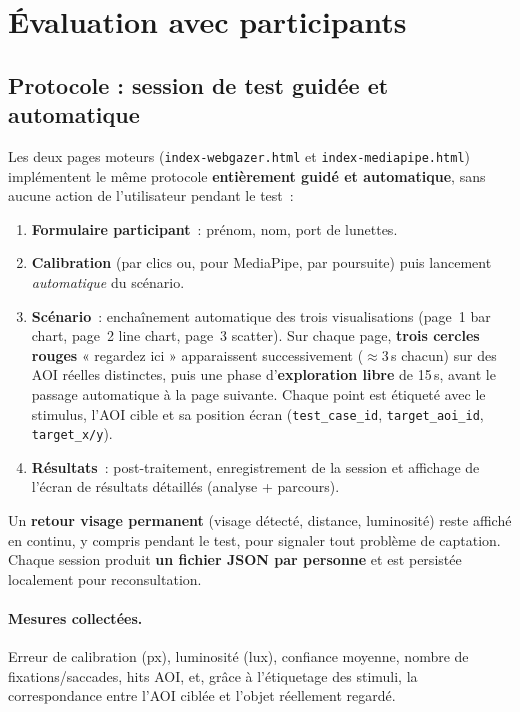 \documentclass[11pt,a4paper]{article}
\newcommand{\code}[1]{\texttt{\small #1}}
\begin{document}
\section{Évaluation avec participants}

\subsection{Protocole : session de test guidée et automatique}

Les deux pages moteurs (\code{index-webgazer.html} et \code{index-mediapipe.html})
implémentent le même protocole \textbf{entièrement guidé et automatique}, sans aucune
action de l'utilisateur pendant le test~:
\begin{enumerate}[leftmargin=1.5em]
  \item \textbf{Formulaire participant}~: prénom, nom, port de lunettes.
  \item \textbf{Calibration} (par clics ou, pour MediaPipe, par poursuite) puis
  lancement \emph{automatique} du scénario.
  \item \textbf{Scénario}~: enchaînement automatique des trois visualisations
  (page~1 bar chart, page~2 line chart, page~3 scatter). Sur chaque page,
  \textbf{trois cercles rouges} « regardez ici » apparaissent successivement
  ($\approx$3\,s chacun) sur des AOI réelles distinctes, puis une phase
  d'\textbf{exploration libre} de 15\,s, avant le passage automatique à la page
  suivante. Chaque point est étiqueté avec le stimulus, l'AOI cible et sa position
  écran (\code{test\_case\_id}, \code{target\_aoi\_id}, \code{target\_x/y}).
  \item \textbf{Résultats}~: post-traitement, enregistrement de la session et
  affichage de l'écran de résultats détaillés (analyse + parcours).
\end{enumerate}
Un \textbf{retour visage permanent} (visage détecté, distance, luminosité) reste
affiché en continu, y compris pendant le test, pour signaler tout problème de
captation. Chaque session produit \textbf{un fichier JSON par personne} et est
persistée localement pour reconsultation.

\paragraph{Mesures collectées.} Erreur de calibration (px), luminosité (lux),
confiance moyenne, nombre de fixations/saccades, hits AOI, et, grâce à
l'étiquetage des stimuli, la correspondance entre l'AOI ciblée et l'objet
réellement regardé.
\end{document}
